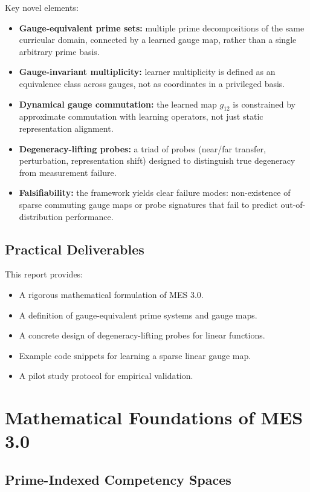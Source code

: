 \documentclass[11pt]{article}
\begin{document}
Key novel elements:
\begin{itemize}[itemsep=3pt]
  \item \textbf{Gauge-equivalent prime sets:} multiple prime decompositions of the same curricular domain, connected by a learned gauge map, rather than a single arbitrary prime basis.
  \item \textbf{Gauge-invariant multiplicity:} learner multiplicity is defined as an equivalence class across gauges, not as coordinates in a privileged basis.
  \item \textbf{Dynamical gauge commutation:} the learned map $g_{12}$ is constrained by approximate commutation with learning operators, not just static representation alignment.
  \item \textbf{Degeneracy-lifting probes:} a triad of probes (near/far transfer, perturbation, representation shift) designed to distinguish true degeneracy from measurement failure.
  \item \textbf{Falsifiability:} the framework yields clear failure modes: non-existence of sparse commuting gauge maps or probe signatures that fail to predict out-of-distribution performance.
\end{itemize}

\subsection{Practical Deliverables}

This report provides:
\begin{itemize}[itemsep=3pt]
  \item A rigorous mathematical formulation of MES 3.0.
  \item A definition of gauge-equivalent prime systems and gauge maps.
  \item A concrete design of degeneracy-lifting probes for linear functions.
  \item Example code snippets for learning a sparse linear gauge map.
  \item A pilot study protocol for empirical validation.
\end{itemize}

\section{Mathematical Foundations of MES 3.0}

\subsection{Prime-Indexed Competency Spaces}
\end{document}
